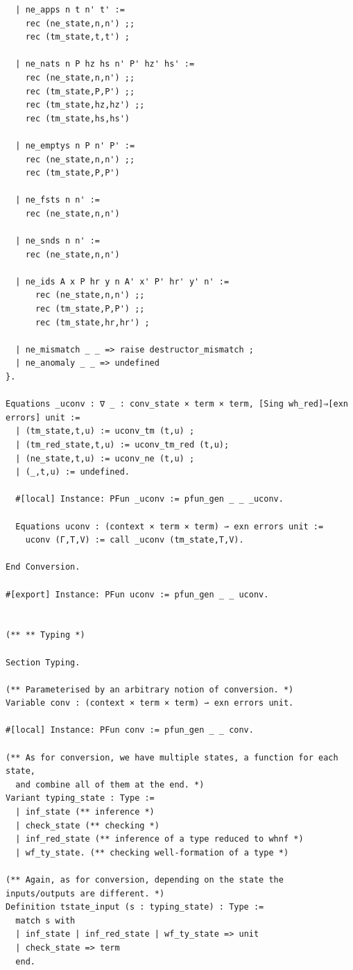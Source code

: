 \documentclass[10pt,a4paper]{amsart}
\begin{document}
\begin{lstlisting}
  | ne_apps n t n' t' :=
    rec (ne_state,n,n') ;;
    rec (tm_state,t,t') ;

  | ne_nats n P hz hs n' P' hz' hs' :=
    rec (ne_state,n,n') ;;
    rec (tm_state,P,P') ;;
    rec (tm_state,hz,hz') ;;
    rec (tm_state,hs,hs')

  | ne_emptys n P n' P' :=
    rec (ne_state,n,n') ;;
    rec (tm_state,P,P')

  | ne_fsts n n' :=
    rec (ne_state,n,n')

  | ne_snds n n' :=
    rec (ne_state,n,n')

  | ne_ids A x P hr y n A' x' P' hr' y' n' :=
      rec (ne_state,n,n') ;;
      rec (tm_state,P,P') ;;
      rec (tm_state,hr,hr') ;

  | ne_mismatch _ _ => raise destructor_mismatch ;
  | ne_anomaly _ _ => undefined
}.

Equations _uconv : ∇ _ : conv_state × term × term, [Sing wh_red]⇒[exn errors] unit :=
  | (tm_state,t,u) := uconv_tm (t,u) ;
  | (tm_red_state,t,u) := uconv_tm_red (t,u);
  | (ne_state,t,u) := uconv_ne (t,u) ;
  | (_,t,u) := undefined.

  #[local] Instance: PFun _uconv := pfun_gen _ _ _uconv.

  Equations uconv : (context × term × term) ⇀ exn errors unit :=
    uconv (Γ,T,V) := call _uconv (tm_state,T,V).
  
End Conversion.

#[export] Instance: PFun uconv := pfun_gen _ _ uconv.


(** ** Typing *)

Section Typing.

(** Parameterised by an arbitrary notion of conversion. *)
Variable conv : (context × term × term) ⇀ exn errors unit.

#[local] Instance: PFun conv := pfun_gen _ _ conv.

(** As for conversion, we have multiple states, a function for each state,
  and combine all of them at the end. *)
Variant typing_state : Type :=
  | inf_state (** inference *)
  | check_state (** checking *)
  | inf_red_state (** inference of a type reduced to whnf *)
  | wf_ty_state. (** checking well-formation of a type *)

(** Again, as for conversion, depending on the state the inputs/outputs are different. *)
Definition tstate_input (s : typing_state) : Type :=
  match s with
  | inf_state | inf_red_state | wf_ty_state => unit
  | check_state => term
  end.


\end{lstlisting}
\end{document}
